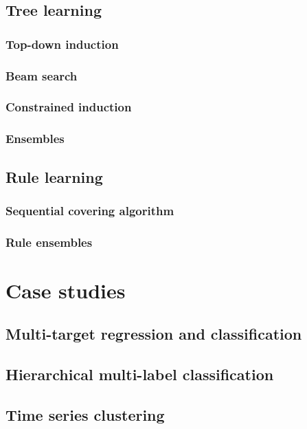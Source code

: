 \section{Tree learning}

\subsection{Top-down induction}

\subsection{Beam search}

\subsection{Constrained induction}

\subsection{Ensembles}

\section{Rule learning}

\subsection{Sequential covering algorithm}

\subsection{Rule ensembles}

\chapter{Case studies}

\section{Multi-target regression and classification}

\section{Hierarchical multi-label classification}

\section{Time series clustering}

